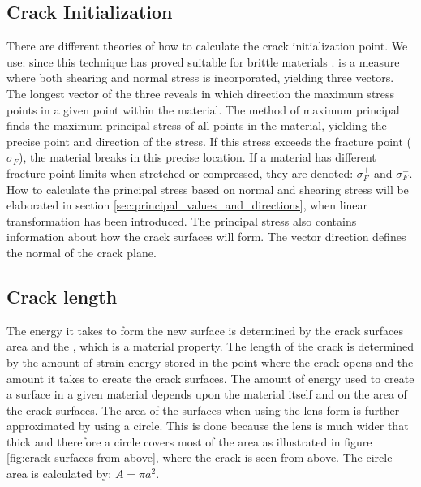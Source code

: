 \subsection{Crack Initialization}
\label{sec:physics_crack_init}
There are different theories of how to calculate the crack
initialization point. We use:  since this
technique has proved suitable for brittle materials
.
%
 is a measure where both shearing and normal
stress is incorporated, yielding three vectors. The longest vector of
the three reveals in which direction the maximum stress points in a
given point within the material. The method of maximum principal finds
the maximum principal stress of all points in the material, yielding
the precise point and direction of the stress.
%
If this stress exceeds the fracture point ($\sigma_F$), the material
breaks in this precise location. If a material has different
fracture point limits when stretched or compressed, they are
denoted: $\sigma_F^+$ and $\sigma_F^-$.
% 
How to calculate the principal stress based on normal and shearing
stress will be elaborated in section
\vref{sec:principal_values_and_directions}, when linear transformation
has been introduced.
%
The principal stress also contains information about how the crack
surfaces will form. The vector direction defines the normal of the
crack plane.

\subsection{Crack length}
The energy it takes to form the new surface is determined by the
crack surfaces area and the , which
is a material property.
The length of the crack is determined by the amount of strain energy
stored in the point where the crack opens and the amount it takes to
create the crack surfaces. The amount of energy used to create a
surface in a given material depends upon the material itself and on
the area of the crack surfaces. The area of the surfaces when using
the lens form is further approximated by using a circle. This is done
because the lens is much wider that thick and therefore a circle
covers most of the area as illustrated in figure
\vref{fig:crack-surfaces-from-above}, where the crack is seen from
above. The circle area is calculated by: $A = \pi a^2$.

